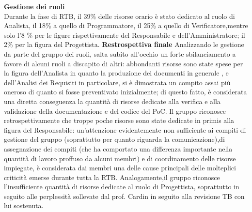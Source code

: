 \textbf{Gestione dei ruoli} \\
Durante la fase di RTB, il 39\% delle risorse orario è stato dedicato al ruolo di Analista, il 18\% a quello di Programmatore, il 25\% a quello di Verificatore,mentre
solo l'8 \%  per le figure rispettivamente del Responsabile e dell'Amministratore; il 2\% per la figura del Progettista.
\textbf{Restrospettiva finale}
Analizzando le gestione da parte del gruppo dei ruoli, salta subito all'occhio un forte sbilanciamento a favore di alcuni ruoli a discapito di altri: abbondanti risorse sono state spese
per la figura dell'Analista in quanto la produzione dei documenti in generale , e dell'Analisi dei Requisiti in particolare, si è dimostrata un compito assai più oneroso di quanto si fosse preventivato
inizialmente; di questo fatto, è considerata una diretta conseguenza la quantità di risorse dedicate alla verifica e alla validazione della documentazione e del codice del PoC. Il gruppo riconosce retrospettivamente 
che troppe poche risorse sono state dedicate in primis alla figura del Responsabile: un'attenzione evidentemente non sufficiente ai compiti di gestione del gruppo (soprattutto per quanto riguarda la comunicazione),di assegnazione
dei compiti (che ha comportato una differenza importante nella quantità di lavoro proffuso da alcuni membri) e
di coordinamento delle risorse impiegate, è considerata dai membri una delle cause principali delle molteplici criticità emerse durante tutta la RTB. Analogamente,il gruppo riconosce l'insufficiente quantità di risorse dedicate al ruolo di Progettista,
soprattutto in seguito alle perplessità sollevate dal prof. Cardin in seguito alla revisione TB con lui sostenuta.

